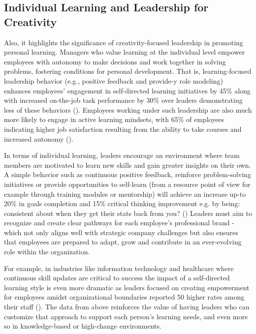 \subsection{Individual Learning and Leadership for Creativity}

Also, it highlights the significance of creativity-focused leadership in promoting personal
learning. Managers who value learning at the individual level empower employees with autonomy to
make decisions and work together in solving problems, fostering conditions for personal development.
That is, learning-focused leadership behavior (e.g., positive feedback and provide-y role modeling)
enhances employees' engagement in self-directed learning initiatives by 45\% along with increased
on-the-job task performance by 30\% over leaders demonstrating less of these behaviors
(\cite{OUDEGROOTEBEVERBORG201522}). Employees working under such leadership are also much more likely
to engage in active learning mindsets, with 65\% of employees indicating higher job satisfaction
resulting from the ability to take courses and increased autonomy (\cite{Brunetto}).

In terms of individual learning, leaders encourage an environment where team members are motivated
to learn new skills and gain greater insights on their own. A simple behavior such as continuous
positive feedback, reinforce problem-solving initiatives or provide opportunities to self-learn
(from a resource point of view for example through training modules or mentorship) will achieve an
increase up-to 20\% in goals completion and 15\% critical thinking improvement e.g. by being:
consistent about when they get their stats back from you? (\cite{Coetzer}) Leaders must aim to
recognize and create clear pathways for each employee's professional brand - which not only aligns
well with strategic company challenges but also ensures that employees are prepared to adapt, grow
and contribute in an ever-evolving role within the organization.

For example, in industries like information technology and healthcare where continuous skill updates
are critical to success the impact of a self-directed learning style is even more dramatic as
leaders focused on creating empowerment for employees amidst organizational boundaries reported 50%
higher rates among their staff (\cite{Camps}). The data from above reinforces the value of having
leaders who can customize that approach to support each person's learning needs, and even more so in
knowledge-based or high-change environments.


